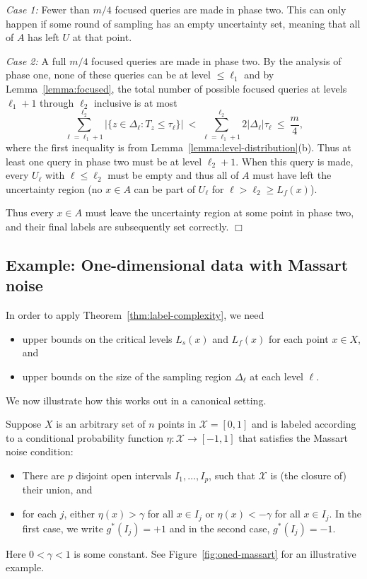 \documentclass{article}
\def\X{{\mathcal X}}
\newenvironment{proof}{\noindent {\sc Proof:}}{$\Box$ \medskip}
\begin{document}
\begin{proof}
{\it Case 1:} Fewer than $m/4$ focused queries are made in phase two. This can only happen if some round of sampling has an empty uncertainty set, meaning that all of $A$ has left $U$ at that point.

{\it Case 2:} A full $m/4$ focused queries are made in phase two. By the analysis of phase one, none of these queries can be at level $\leq \ell_1$ and by Lemma~\ref{lemma:focused}, the total number of possible focused queries at levels $\ell_1+1$ through $\ell_2$ inclusive is at most
$$\sum_{\ell=\ell_1+1}^{\ell_2} |\{z \in \Delta_{\ell}: T_z \leq \tau_\ell \}| 
\ < \ 
\sum_{\ell=\ell_1+1}^{\ell_2} 2 |\Delta_{\ell}| \tau_\ell
\ \leq \ 
\frac{m}{4} ,
$$
where the first inequality is from Lemma~\ref{lemma:level-distribution}(b). Thus at least one query in phase two must be at level $\ell_2 +1$. When this query is made, every $U_\ell$ with $\ell \leq \ell_2$ must be empty and thus all of $A$ must have left the uncertainty region (no $x \in A$ can be part of $U_\ell$ for $\ell > \ell_2 \geq L_f(x)$). 

Thus every $x \in A$ must leave the uncertainty region at some point in phase two, and their final labels are subsequently set correctly.
\end{proof}

\subsection{Example: One-dimensional data with Massart noise}

In order to apply Theorem~\ref{thm:label-complexity}, we need
\begin{itemize}
\item upper bounds on the critical levels $L_s(x)$ and $L_f(x)$ for each point $x \in X$, and
\item upper bounds on the size of the sampling region $\Delta_\ell$ at each level $\ell$.
\end{itemize}
We now illustrate how this works out in a canonical setting.

Suppose $X$ is an arbitrary set of $n$ points in $\X = [0,1]$ and is labeled according to a conditional probability function $\eta: \X \to [-1,1]$ that satisfies the Massart noise condition:
\begin{itemize}
\item There are $p$ disjoint open intervals $I_1, \ldots, I_p$, such that $\X$ is (the closure of) their union, and
\item for each $j$, either $\eta(x) > \gamma$ for all $x \in I_j$ or $\eta(x) < -\gamma$ for all $x \in I_j$. In the first case, we write $g^*(I_j) = +1$ and in the second case, $g^*(I_j) = -1$.
\end{itemize}
Here $0 < \gamma < 1$ is some constant. See Figure~\ref{fig:oned-massart} for an illustrative example.
\end{document}
